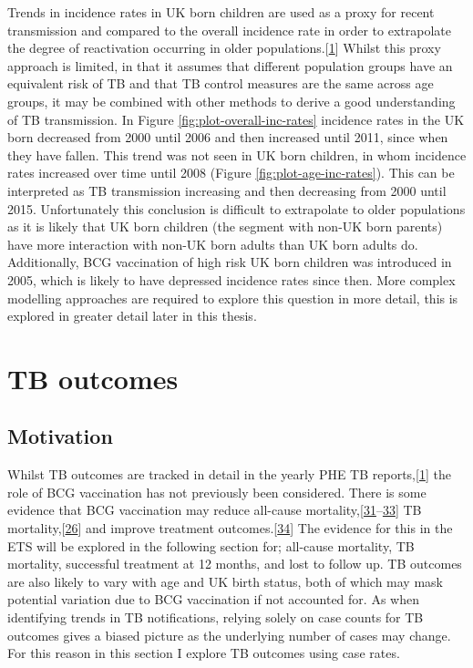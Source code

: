 \documentclass[11pt,twoside]{bristolthesis}
\begin{document}
  Trends in incidence rates in UK born children are used as a proxy for recent transmission and compared to the overall incidence rate in order to extrapolate the degree of reactivation occurring in older populations.{[}\protect\hyperlink{ref-PHE2017}{1}{]} Whilst this proxy approach is limited, in that it assumes that different population groups have an equivalent risk of TB and that TB control measures are the same across age groups, it may be combined with other methods to derive a good understanding of TB transmission. In Figure \ref{fig:plot-overall-inc-rates} incidence rates in the UK born decreased from 2000 until 2006 and then increased until 2011, since when they have fallen. This trend was not seen in UK born children, in whom incidence rates increased over time until 2008 (Figure \ref{fig:plot-age-inc-rates}). This can be interpreted as TB transmission increasing and then decreasing from 2000 until 2015. Unfortunately this conclusion is difficult to extrapolate to older populations as it is likely that UK born children (the segment with non-UK born parents) have more interaction with non-UK born adults than UK born adults do. Additionally, BCG vaccination of high risk UK born children was introduced in 2005, which is likely to have depressed incidence rates since then. More complex modelling approaches are required to explore this question in more detail, this is explored in greater detail later in this thesis.
  
  \hypertarget{tb-outcomes}{%
  \section{TB outcomes}\label{tb-outcomes}}
  
  \hypertarget{motivation-1}{%
  \subsection{Motivation}\label{motivation-1}}
  
  Whilst TB outcomes are tracked in detail in the yearly PHE TB reports,{[}\protect\hyperlink{ref-PHE2017}{1}{]} the role of BCG vaccination has not previously been considered. There is some evidence that BCG vaccination may reduce all-cause mortality,{[}\protect\hyperlink{ref-Garly2003}{31}--\protect\hyperlink{ref-Rieckmann2016}{33}{]} TB mortality,{[}\protect\hyperlink{ref-Abubakar2013}{26}{]} and improve treatment outcomes.{[}\protect\hyperlink{ref-Jeremiah2010}{34}{]} The evidence for this in the ETS will be explored in the following section for; all-cause mortality, TB mortality, successful treatment at 12 months, and lost to follow up. TB outcomes are also likely to vary with age and UK birth status, both of which may mask potential variation due to BCG vaccination if not accounted for. As when identifying trends in TB notifications, relying solely on case counts for TB outcomes gives a biased picture as the underlying number of cases may change. For this reason in this section I explore TB outcomes using case rates.
  
\end{document}
